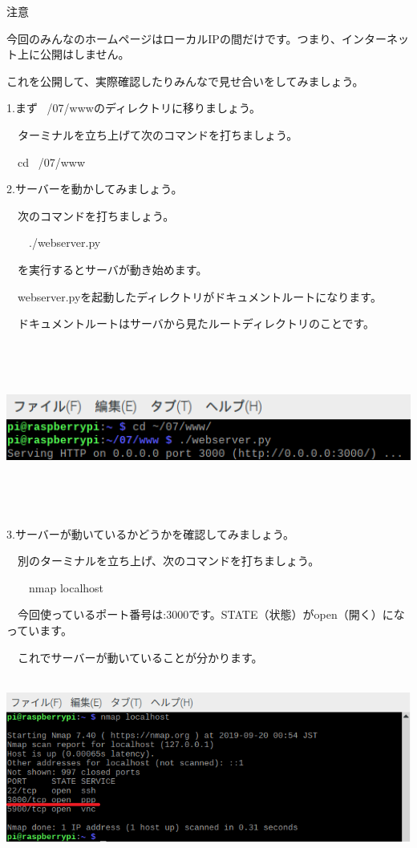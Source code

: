 \documentclass[a4paper,12pt,dvipdfmx]{jarticle}
\begin{document}
注意

今回のみんなのホームページはローカルIPの間だけです。つまり、インターネット上に公開はしません。

これを公開して、実際確認したりみんなで見せ合いをしてみましょう。


\bigskip

1.まず
~/07/wwwのディレクトリに移りましょう。

\ \ ターミナルを立ち上げて次のコマンドを打ちましょう。

\ \ cd ~/07/www


\bigskip

2.サーバーを動かしてみましょう。

\ \ 次のコマンドを打ちましょう。

\ \ 　./webserver.py

\ \ を実行するとサーバが動き始めます。

\ \ webserver.pyを起動したディレクトリがドキュメントルートになります。

\ \ ドキュメントルートはサーバから見たルートディレクトリのことです。



\centering
\includegraphics[width=14.986cm,height=5.565cm]{ome7-img038.png}
\flushleft


\bigskip


\bigskip

3.サーバーが動いているかどうかを確認してみましょう。

\ \ 別のターミナルを立ち上げ、次のコマンドを打ちましょう。

\ \ 　nmap localhost

\ \ 今回使っているポート番号は:3000です。STATE（状態）がopen（開く）になっています。

\ \ これでサーバーが動いていることが分かります。



\centering
\includegraphics[width=16.124cm,height=5.973cm]{ome7-img039.png}
\flushleft
\end{document}
